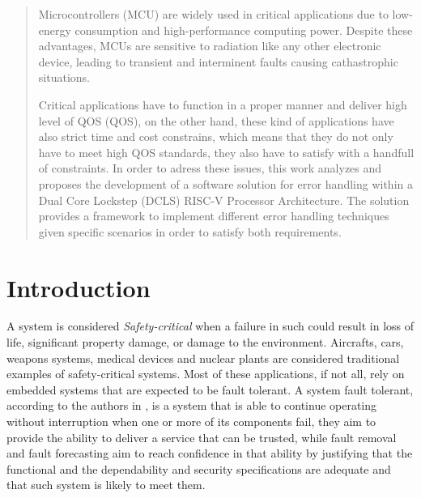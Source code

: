 \documentclass[10pt, a4paper]{report}
\begin{document}
\newpage

\begin{abstract}
    \thispagestyle{fancy}
    Microcontrollers (\acrshort{MCU}) are widely used in critical applications 
    due to low-energy consumption and high-performance computing power. Despite 
    these advantages, \acrshort{MCU}s are sensitive to radiation like any other
    electronic device, leading to transient and interminent faults causing
    cathastrophic situations.

    Critical applications have to function in a proper manner and deliver high
    level of \acrlong{QOS} (\acrshort{QOS}), on the other hand, these kind of
    applications have also strict time and cost constrains, which means that
    they do not only have to meet high \acrshort{QOS} standards, they also have
    to satisfy with a handfull of constraints. In order to adress these issues, 
    this work analyzes and proposes the development of a software solution for 
    error handling within a Dual Core Lockstep (\acrshort{DCLS}) RISC-V 
    Processor Architecture. The solution provides a framework to implement 
    different error handling techniques given specific scenarios in order to 
    satisfy both requirements.
\end{abstract}

\newpage
\begin{tableofcontents}
    \thispagestyle{fancy}
\end{tableofcontents}

\newpage

\chapter{Introduction}\label{introduction}

\thispagestyle{fancy}
A system is considered \emph{Safety-critical} when a failure in such could
result in loss of life, significant property damage, or damage to the
environment. Aircrafts, cars, weapons systems, medical devices and nuclear 
plants are considered traditional examples of safety-critical systems. Most of 
these applications, if not all, rely on embedded systems that are expected to be 
fault tolerant. A system fault tolerant, according to the authors in 
\cite{nasa_fault_tolerance}, is a system that is able to continue operating 
without interruption when one or more of its components fail, they aim 
to provide the ability to deliver a service that can be trusted, while fault 
removal and fault forecasting aim to reach confidence in that ability by 
justifying that the functional and the dependability and security specifications 
are adequate and that such system is likely to meet them.
\end{document}
